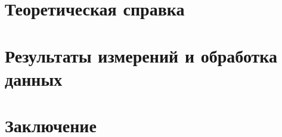 \documentclass[a4paper, 12pt]{article}
\begin{document}
\section{Теоретическая справка} 
    

    
    
\section{Результаты измерений и обработка данных} 

    
\section{Заключение}
    
    
\end{document}
